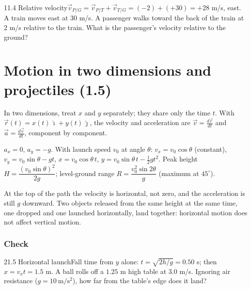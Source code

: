 \documentclass[11pt]{article}
\begin{document}
\begin{q}{1}{1.4 Relative velocity}{$\vec v_{P/G} = \vec v_{P/T} + \vec v_{T/G} = (-2) + (+30) = +28$ m/s, east.}
A train moves east at $30$ m/s. A passenger walks toward the back of the train at $2$ m/s relative to the train. What is the passenger's velocity relative to the ground?
\end{q}

\section{Motion in two dimensions and projectiles (1.5)}\label{sec:5}

In two dimensions, treat $x$ and $y$ separately; they share only the time $t$. With $\vec r(t) = x(t)\,\hat\imath + y(t)\,\hat\jmath$, the velocity and acceleration are $\vec v = \frac{d\vec r}{dt}$ and $\vec a = \frac{d\vec v}{dt}$, component by component.

\begin{keyidea}
$a_x = 0$, $a_y = -g$. With launch speed $v_0$ at angle $\theta$:
$v_x = v_0\cos\theta$ (constant), $v_y = v_0\sin\theta - gt$,
$x = v_0\cos\theta\, t$, $y = v_0\sin\theta\, t - \tfrac12 g t^2$.
Peak height $H = \dfrac{(v_0\sin\theta)^2}{2g}$; level-ground range $R = \dfrac{v_0^2 \sin 2\theta}{g}$ (maximum at $45^\circ$).
\end{keyidea}

\begin{trap}
At the top of the path the velocity is horizontal, not zero, and the acceleration is still $g$ downward. Two objects released from the same height at the same time, one dropped and one launched horizontally, land together: horizontal motion does not affect vertical motion.
\end{trap}

\subsubsection{Check}\mbox{}

\begin{q}{2}{1.5 Horizontal launch}{Fall time from $y$ alone: $t = \sqrt{2h/g} = 0.50$ s; then $x = v_x t = 1.5$ m.}
A ball rolls off a $1.25$ m high table at $3.0$ m/s. Ignoring air resistance ($g = 10\ \mathrm{m/s^2}$), how far from the table's edge does it land?
\end{q}

\makekey
\end{document}
